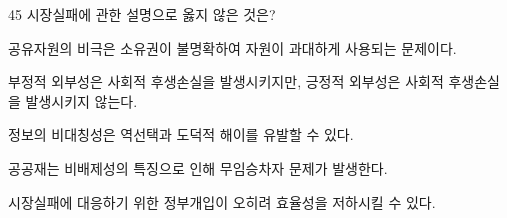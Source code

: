 \begin{question}{45}
시장실패에 관한 설명으로 옳지 않은 것은?
\begin{choices}
  \item 공유자원의 비극은 소유권이 불명확하여 자원이 과대하게 사용되는 문제이다.
  \item 부정적 외부성은 사회적 후생손실을 발생시키지만, 긍정적 외부성은 사회적 후생손실을 발생시키지 않는다.
  \item 정보의 비대칭성은 역선택과 도덕적 해이를 유발할 수 있다.
  \item 공공재는 비배제성의 특징으로 인해 무임승차자 문제가 발생한다.
  \item 시장실패에 대응하기 위한 정부개입이 오히려 효율성을 저하시킬 수 있다.
\end{choices}
\end{question}
